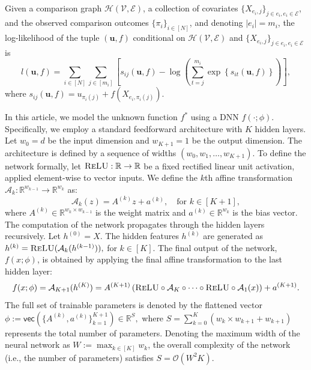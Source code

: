 \documentclass[
  12pt]{article}
\begin{document}
Given a comparison graph $\mathcal{H}(\mathcal{V}, \mathcal{E})$, a collection of covariates $\{X_{e_i, j}\}_{j \in e_i, e_i \in \mathcal{E}}$, and the observed comparison outcomes $\{\pi_i\}_{i \in [N]}$, and denoting $|e_i| = m_i$, the log-likelihood of the tuple $(\boldsymbol{u}, f)$ conditional on $\mathcal{H}(\mathcal{V}, \mathcal{E})$ and $\{X_{e_i, j}\}_{j \in e_i, e_i \in \mathcal{E}}$ is 
\begin{equation}
l(\boldsymbol{u}, f) = \sum_{i \in [N]} \sum_{j \in [m_i]} \left[ s_{ij}(\boldsymbol{u}, f) - \log \left( \sum_{t=j}^{m_i} \exp \left\{ s_{it}(\boldsymbol{u}, f) \right\} \right) \right], \label{eq:mle}
\end{equation}
\noindent where $s_{ij}(\boldsymbol{u}, f) = u_{\pi_i(j)} + f(X_{e_i, \pi_i(j)})$.

In this article, we model the unknown function $f^*$ using a DNN $f(\cdot; \phi)$. Specifically, we employ a standard feedforward architecture with $K$ hidden layers. Let $w_0 = d$ be the input dimension and $w_{K+1} = 1$ be the output dimension. The architecture is defined by a sequence of widths $(w_0, w_1, \ldots, w_{K+1})$. To define the network formally, let $\textsc{ReLU}: \mathbb{R} \to \mathbb{R}$ be a fixed rectified linear unit activation, applied element-wise to vector inputs. We define the $k$th affine transformation $\mathcal{A}_k: \mathbb{R}^{w_{k-1}} \to \mathbb{R}^{w_k}$ as:
\begin{equation}
    \mathcal{A}_k(z) = A^{(k)} z + a^{(k)}, \quad \text{for } k \in [K+1],
\end{equation}
where $A^{(k)} \in \mathbb{R}^{w_k \times w_{k-1}}$ is the weight matrix and $a^{(k)} \in \mathbb{R}^{w_k}$ is the bias vector. The computation of the network propagates through the hidden layers recursively. Let $h^{(0)} = X$. The hidden features $h^{(k)}$ are generated as
$h^{(k)} = \textsc{ReLU} ( \mathcal{A}_k( h^{(k-1)} ) ),$ for $ k \in [K]$. The final output of the network, $f(x; \phi)$, is obtained by applying the final affine transformation to the last hidden layer:
\begin{equation}
\label{DNN_functional}
    f(x; \phi) = \mathcal{A}_{K+1}(h^{(K)}) = A^{(K+1)} \left( \textsc{ReLU} \circ \mathcal{A}_K \circ \cdots \circ \textsc{ReLU} \circ \mathcal{A}_1 (x) \right) + a^{(K+1)}.
\end{equation}
The full set of trainable parameters is denoted by the flattened vector $\phi := \mathsf{vec}( \{ A^{(k)}, a^{(k)} \}_{k=1}^{K+1} ) \in \mathbb{R}^S,$ where $S = \sum_{k=0}^{K} (w_k \times w_{k+1} + w_{k+1})$ represents the total number of parameters. Denoting the maximum width of the neural network as $W:=\max_{k\in[K]} w_k$, the overall complexity of the network (i.e., the number of parameters) satisfies $S = \mathcal{O}(W^2 K)$.
\end{document}
